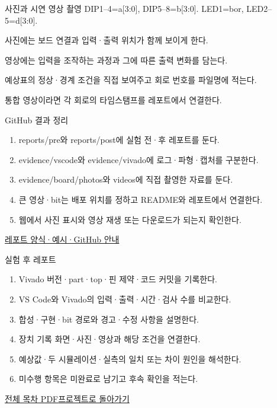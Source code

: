 \begin{frame}{사진과 시연 영상 촬영}\relax
\small
DIP1–4=a[3:0], DIP5–8=b[3:0]. LED1=bor, LED2–5=d[3:0].\par\vspace{0.22cm}사진에는 보드 연결과 입력·출력 위치가 함께 보이게 한다.\par\vspace{0.22cm}영상에는 입력을 조작하는 과정과 그에 따른 출력 변화를 담는다.\par\vspace{0.22cm}예상표의 정상·경계 조건을 직접 보여주고 회로 번호를 파일명에 적는다.\par\vspace{0.22cm}통합 영상이라면 각 회로의 타임스탬프를 레포트에서 연결한다.\par
\end{frame}

\begin{frame}{GitHub 결과 정리}\relax
\small
\begin{enumerate}\setlength{\itemsep}{0.22cm}
\item reports/pre와 reports/post에 실험 전·후 레포트를 둔다.
\item evidence/vscode와 evidence/vivado에 로그·파형·캡처를 구분한다.
\item evidence/board/photos와 videos에 직접 촬영한 자료를 둔다.
\item 큰 영상·bit는 배포 위치를 정하고 README와 레포트에서 연결한다.
\item 웹에서 사진 표시와 영상 재생 또는 다운로드가 되는지 확인한다.
\end{enumerate}
\href{https://github.com/Glaysia/ece2_26_2_2/blob/daily/0910/example/fpga_projects_hdl/LAB1/docs/reports.md}{레포트 양식·예시·GitHub 안내}
\end{frame}

\begin{frame}{실험 후 레포트}\relax
\small
\begin{enumerate}\setlength{\itemsep}{0.22cm}
\item Vivado 버전·part·top·핀 제약·코드 커밋을 기록한다.
\item VS Code와 Vivado의 입력·출력·시간·검사 수를 비교한다.
\item 합성·구현·bit 경로와 경고·수정 사항을 설명한다.
\item 장치 기록 화면·사진·영상과 해당 조건을 연결한다.
\item 예상값·두 시뮬레이션·실측의 일치 또는 차이 원인을 해석한다.
\item 미수행 항목은 미완료로 남기고 후속 확인을 적는다.
\end{enumerate}
\href{04.LAB1_00_CONTENTS.pdf}{전체 목차 PDF}\quad\href{https://github.com/Glaysia/fpga-lab-example-vivado-2026-1-04-subtractor4/tree/f7d79cd1f95d423edaa3746b75002b0ecf8c5eea}{프로젝트로 돌아가기}
\end{frame}
\endgroup


